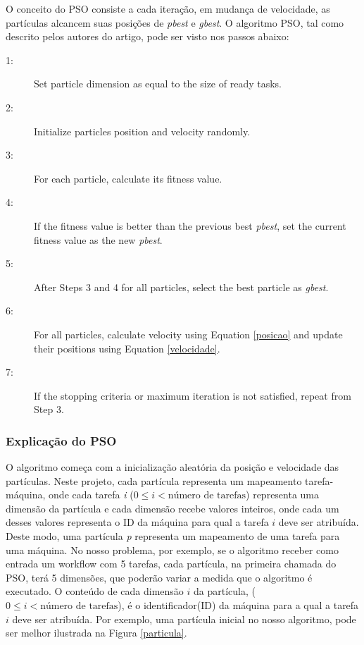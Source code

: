 \documentclass[a4paper,10pt]{article}
\begin{document}
O conceito do PSO consiste a cada iteração, em mudança de velocidade, as partículas 
alcancem suas posições de \emph{pbest} e \emph{gbest}. O algoritmo PSO, tal como descrito pelos 
autores do artigo, pode ser visto nos passos abaixo:\\

\begin{description}
\item[1:] Set particle dimension as equal to the size of ready tasks.
\item[2:] Initialize particles position and velocity randomly.
\item[3:] For each particle, calculate its fitness value.
\item[4:] If the fitness value is better than the previous best \emph{pbest}, set the current fitness value as the new \emph{pbest}.
\item[5:] After Steps 3 and 4 for all particles, select the best particle as \emph{gbest}.
\item[6:] For all particles, calculate velocity using Equation \eqref{posicao} and update their positions using Equation \eqref{velocidade}.
\item[7:] If the stopping criteria or maximum iteration is not satisfied, repeat from Step 3.
\end{description}



\subsubsection{Explicação do PSO}

O algoritmo começa com a inicialização aleatória da posição e velocidade das partículas. Neste projeto, 
cada partícula representa um mapeamento tarefa-máquina, onde cada tarefa \emph{i} ($0 \leq i < \text{número de tarefas}$) representa uma dimensão da partícula
e cada dimensão recebe valores inteiros, onde cada um desses valores representa o ID da máquina para qual a tarefa $i$ deve ser atribuída.\\

Deste modo, uma partícula \emph{p} representa um mapeamento de uma tarefa para uma máquina. No nosso problema, por exemplo, se o 
algoritmo receber como entrada um workflow com 5 tarefas, cada partícula, na primeira chamada do PSO, terá 5 dimensões, que poderão variar 
a medida que o algoritmo é executado. O conteúdo de cada dimensão $i$ da partícula, ($0 \leq i < \text{número de tarefas}$), 
é o identificador(ID) da máquina para a qual a tarefa $i$ deve ser atribuída. Por exemplo, uma partícula inicial no nosso algoritmo, 
pode ser melhor ilustrada na Figura \eqref{particula}.\\
\end{document}

